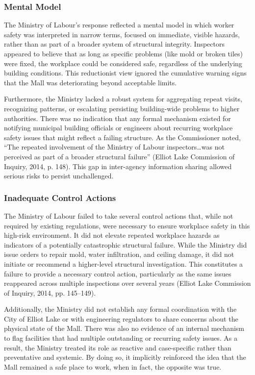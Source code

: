 \documentclass[12pt]{article}
\begin{document}
\subsubsection*{Mental Model}
The Ministry of Labour’s response reflected a mental model in which worker safety was interpreted in narrow terms, focused on immediate, visible hazards, rather than as part of a broader system of structural integrity. Inspectors appeared to believe that as long as specific problems (like mold or broken tiles) were fixed, the workplace could be considered safe, regardless of the underlying building conditions. This reductionist view ignored the cumulative warning signs that the Mall was deteriorating beyond acceptable limits.

Furthermore, the Ministry lacked a robust system for aggregating repeat visits, recognizing patterns, or escalating persisting building-wide problems to higher authorities. There was no indication that any formal mechanism existed for notifying municipal building officials or engineers about recurring workplace safety issues that might reflect a failing structure. As the Commissioner noted, “The repeated involvement of the Ministry of Labour inspectors…was not perceived as part of a broader structural failure” (Elliot Lake Commission of Inquiry, 2014, p. 148). This gap in inter-agency information sharing allowed serious risks to persist unchallenged.

\subsubsection*{Inadequate Control Actions}
The Ministry of Labour failed to take several control actions that, while not required by existing regulations, were necessary to ensure workplace safety in this high-risk environment. It did not elevate repeated workplace hazards as indicators of a potentially catastrophic structural failure. While the Ministry did issue orders to repair mold, water infiltration, and ceiling damage, it did not initiate or recommend a higher-level structural investigation. This constitutes a failure to provide a necessary control action, particularly as the same issues reappeared across multiple inspections over several years (Elliot Lake Commission of Inquiry, 2014, pp. 145–149).

Additionally, the Ministry did not establish any formal coordination with the City of Elliot Lake or with engineering regulators to share concerns about the physical state of the Mall. There was also no evidence of an internal mechanism to flag facilities that had multiple outstanding or recurring safety issues. As a result, the Ministry treated its role as reactive and case-specific rather than preventative and systemic. By doing so, it implicitly reinforced the idea that the Mall remained a safe place to work, when in fact, the opposite was true.
\end{document}
